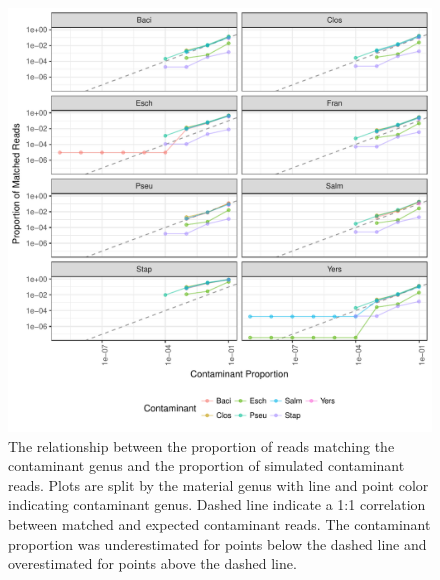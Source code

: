 \documentclass[fleqn,10pt,lineno]{wlpeerj}\usepackage[]{graphicx}\usepackage[]{color}
\makeatletter
\def\maxwidth{ %
  \ifdim\Gin@nat@width>\linewidth
    \linewidth
  \else
    \Gin@nat@width
  \fi
}
\newenvironment{knitrout}{}{} %
\makeatother
\begin{document}
\begin{knitrout}
\color{fgcolor}\begin{figure}
\includegraphics[width=\maxwidth]{figure/contam_fig-1} \caption[The relationship between the proportion of reads matching the contaminant genus and the proportion of simulated contaminant reads]{The relationship between the proportion of reads matching the contaminant genus and the proportion of simulated contaminant reads. Plots are split by the material genus with line and point color indicating contaminant genus. Dashed line indicate a 1:1 correlation between matched and expected contaminant reads. The contaminant proportion was underestimated for points below the dashed line and overestimated for points above the dashed line.}\label{fig:contam_fig}
\end{figure}


\end{knitrout}
\end{document}
